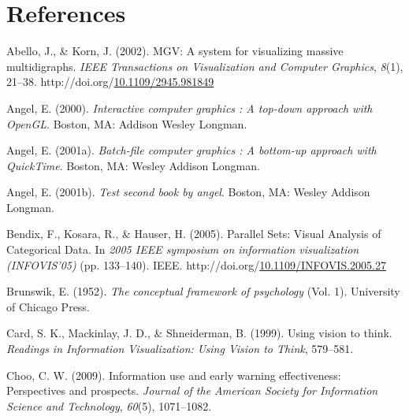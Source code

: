 \documentclass[print]{nuthesis}
\newlength{\cslhangindent}
\newenvironment{CSLReferences}[2]%
{\setlength{\parindent}{0pt}%
\everypar{\setlength{\hangindent}{\cslhangindent}}\ignorespaces}%
{\par}
\begin{document}
\backmatter

\hypertarget{references}{%
\chapter*{References}\label{references}}

\noindent

\setlength{\parindent}{-0.20in}
\setlength{\leftskip}{0.20in}
\setlength{\parskip}{8pt}

\hypertarget{refs}{}
\begin{CSLReferences}{1}{0}
\leavevmode{}%
Abello, J., \& Korn, J. (2002). MGV: A system for visualizing massive multidigraphs. \emph{IEEE Transactions on Visualization and Computer Graphics}, \emph{8}(1), 21--38. http://doi.org/\href{https://doi.org/10.1109/2945.981849}{10.1109/2945.981849}

\leavevmode{}%
Angel, E. (2000). \emph{Interactive computer graphics : A top-down approach with OpenGL}. Boston, MA: Addison Wesley Longman.

\leavevmode{}%
Angel, E. (2001a). \emph{Batch-file computer graphics : A bottom-up approach with QuickTime}. Boston, MA: Wesley Addison Longman.

\leavevmode{}%
Angel, E. (2001b). \emph{Test second book by angel}. Boston, MA: Wesley Addison Longman.

\leavevmode{}%
Bendix, F., Kosara, R., \& Hauser, H. (2005). {Parallel Sets: Visual Analysis of Categorical Data}. In \emph{2005 IEEE symposium on information visualization (INFOVIS'05)} (pp. 133--140). IEEE. http://doi.org/\href{https://doi.org/10.1109/INFOVIS.2005.27}{10.1109/INFOVIS.2005.27}

\leavevmode{}%
Brunswik, E. (1952). \emph{The conceptual framework of psychology} (Vol. 1). University of Chicago Press.

\leavevmode{}%
Card, S. K., Mackinlay, J. D., \& Shneiderman, B. (1999). Using vision to think. \emph{Readings in Information Visualization: Using Vision to Think}, 579--581.

\leavevmode{}%
Choo, C. W. (2009). Information use and early warning effectiveness: Perspectives and prospects. \emph{Journal of the American Society for Information Science and Technology}, \emph{60}(5), 1071--1082.


\end{CSLReferences}
\end{document}
